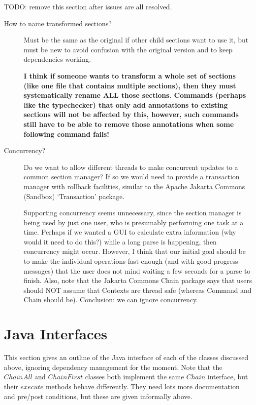 \documentclass{llncs} %
\begin{document}
TODO: remove this section after issues are all resolved.

\begin{description}

\item[How to name transformed sections?]  Must be the same as the
  original if other child sections want to use it, but must
  be new to avoid confusion with the original version and
  to keep dependencies working.

  \textbf{I think if someone wants to transform a whole set of
    sections (like one file that contains multiple sections), then
    they must systematically rename ALL those sections. Commands
    (perhaps like the typechecker) that only add annotations to
    existing sections will not be affected by this, however, such
    commands still have to be able to remove those annotations
    when some following command fails!}

\item[Concurrency?]  Do we want to allow different threads to
  make concurrent updates to a common section manager?  If so
  we would need to provide a transaction manager with rollback
  facilities, similar to the Apache Jakarta Commons (Sandbox) `Transaction'
  package.  
  
  Supporting concurrency seems unnecessary, since the section manager is
  being used by just one user, who is presumably performing one task at a
  time.  Perhaps if we wanted a GUI to calculate extra information (why
  would it need to do this?) while a long parse is happening, then
  concurrency might occur.  However, I think that our initial goal should
  be to make the individual operations fast enough (and with good progress
  messages) that the user does not mind waiting a few seconds for a parse
  to finish.  Also, note that the Jakarta Commons Chain package says
  that users should NOT assume that Contexts are thread safe (whereas
  Command and Chain should be).  Conclusion: we can ignore concurrency.
\end{description}


\section{Java Interfaces}

This section gives an outline of the Java interface of each of the classes
discussed above, ignoring dependency management for the moment.
Note that the $ChainAll$ and $ChainFirst$ classes both implement the
same $Chain$ interface, but their $execute$ methods behave differently.
They need lots more documentation and pre/post conditions, but these are
given informally above. 
\end{document}
